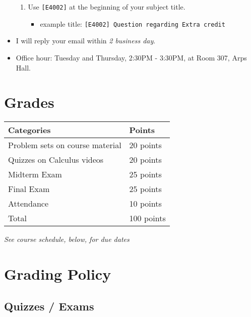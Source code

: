 \documentclass[12pt]{article}
\begin{document}
\begin{itemize}
\begin{enumerate}
        \item Use \texttt{[E4002]} at the beginning of your subject title.
        \begin{itemize}
            \item example title: \texttt{[E4002] Question regarding Extra credit}
        \end{itemize}
    \end{enumerate}
    \item I will reply your email within \textit{2 business day}.
    \item Office hour: Tuesday and Thursday, 2:30PM - 3:30PM, at Room 307, Arps Hall.
\end{itemize}

\newpage

\section*{Grades}

\newlength\q
\setlength{}
\begin{tabular}{|p{\q}|p{\q}|}
    \hline
    Categories  & Points \\
    \hline
    \hline
    Problem sets on course material   & 20 points \\
    \hline
    Quizzes on Calculus videos & 20 points \\
    \hline
    Midterm Exam & 25 points \\
    \hline
    Final Exam & 25 points \\
    \hline
    Attendance & 10 points \\
    \hline
    Total & 100 points \\
    \hline
\end{tabular}
\textit{See course schedule, below, for due dates}


\section*{Grading Policy}

\subsection*{Quizzes / Exams}
\end{document}
